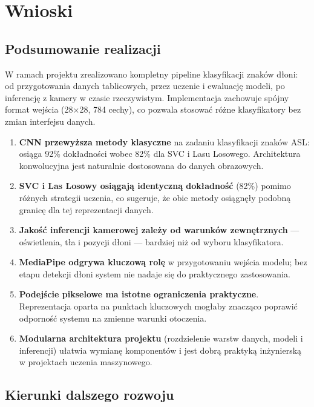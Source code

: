 \chapter{Wnioski}
\label{cha:wnioski}

\section{Podsumowanie realizacji}
\label{sec:podsumowanie}

W ramach projektu zrealizowano kompletny pipeline klasyfikacji znaków dłoni:
od przygotowania danych tablicowych, przez uczenie i ewaluację modeli,
po inferencję z kamery w czasie rzeczywistym. Implementacja zachowuje
spójny format wejścia (28$\times$28, 784 cechy), co pozwala stosować
różne klasyfikatory bez zmian interfejsu danych.

\begin{enumerate}
      \item \textbf{CNN przewyższa metody klasyczne} na zadaniu klasyfikacji
            znaków ASL: osiąga 92\% dokładności wobec 82\% dla SVC i Lasu
            Losowego. Architektura konwolucyjna jest naturalnie dostosowana
            do danych obrazowych.
      \item \textbf{SVC i Las Losowy osiągają identyczną dokładność} (82\%)
            pomimo różnych strategii uczenia, co sugeruje, że obie metody
            osiągnęły podobną granicę dla tej reprezentacji danych.
      \item \textbf{Jakość inferencji kamerowej zależy od warunków zewnętrznych}
            --- oświetlenia, tła i pozycji dłoni --- bardziej niż od wyboru
            klasyfikatora.
      \item \textbf{MediaPipe odgrywa kluczową rolę} w przygotowaniu wejścia
            modelu; bez etapu detekcji dłoni system nie nadaje się do praktycznego
            zastosowania.
      \item \textbf{Podejście pikselowe ma istotne ograniczenia praktyczne}.
            Reprezentacja oparta na punktach kluczowych mogłaby znacząco
            poprawić odporność systemu na zmienne warunki otoczenia.
      \item \textbf{Modularna architektura projektu} (rozdzielenie warstw danych,
            modeli i inferencji) ułatwia wymianę komponentów i jest dobrą
            praktyką inżynierską w projektach uczenia maszynowego.
  \end{enumerate}

\section{Kierunki dalszego rozwoju}
\label{sec:dalszy_rozwoj}

